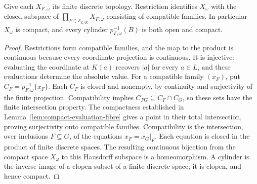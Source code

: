 \begin{lemma}\label{lem:compact-algebraic-fibre}
\leanok
{}
Give each $X_{F,\omega}$ its finite discrete topology. Restriction
identifies $X_\omega$ with the closed subspace of
$\prod_{F\in\mathscr E_{L/K}}X_{F,\omega}$ consisting of compatible
families. In particular $X_\omega$ is compact, and every cylinder
$p_{F,\omega}^{-1}(B)$ is both open and compact.
\end{lemma}
\begin{proof}
Restrictions form compatible families, and the map to the product is
continuous because every coordinate projection is continuous. It is
injective: evaluating the coordinate at $K(a)$ recovers $|a|$ for every
$a\in L$, and these evaluations determine the absolute value.
For a compatible family $(x_F)$, put
$C_F=p_{F,\omega}^{-1}\{x_F\}$. Each $C_F$ is closed and nonempty,
by continuity and surjectivity of the finite projection. Compatibility
implies $C_{FG}\subseteq C_F\cap C_G$, so these sets have the finite
intersection property. The compactness established in
Lemma~\ref{lem:compact-evaluation-fibre} gives a point in their total
intersection, proving surjectivity onto compatible families.
Compatibility is the intersection, over inclusions $F\subseteq G$, of
the equations $x_F=x_G|_F$. Each equation is closed in the product of
finite discrete spaces. The resulting continuous bijection from the
compact space $X_\omega$ to this Hausdorff subspace is a homeomorphism.
A cylinder is the inverse image of a clopen subset of a finite discrete
space; it is clopen, and hence compact.
\end{proof}

